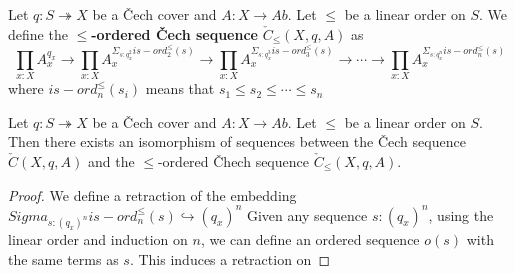 \begin{definition}
  Let $q: S \twoheadrightarrow X$ be a \v Cech cover and $A: X \to Ab$. Let $\leq$ be a linear order on $S$. 
  We define the \textbf{$\leq$-ordered \v Cech sequence} $\check C_{\leq} (X,q,A)$ as 
  $$
  \prod_{x:X} A_x^{q_x}
  \to 
  \prod_{x:X} A_x^{\Sigma_{s: q_x^2 } is-ord^\leq_2(s)}
  \to 
  \prod_{x:X} A_x^{\Sigma_{s: q_x^3 } is-ord^\leq_3(s)}
  \to 
  \cdots 
  \to 
  \prod_{x:X} A_x^{\Sigma_{s: q_x^n } is-ord^\leq_n(s)}
  $$
  where $is-ord^\leq_n(s_i)$ means that $s_1 \leq s_2 \leq \cdots \leq s_n$
\end{definition}
\begin{lemma}
  Let $q: S \twoheadrightarrow X$ be a \v Cech cover and $A: X \to Ab$. Let $\leq$ be a linear order on $S$. 
  Then there exists an isomorphism of sequences between the \v Cech sequence $\check C(X,q,A)$ and the $\leq$-ordered \v Chech sequence $\check C_{\leq}(X , q, A)$. 
\end{lemma}
\begin{proof} 
  We define a retraction of the embedding
  $
  Sigma_{s:(q_x)^n} is-ord_n^\leq(s) \hookrightarrow (q_x)^n
  $ 
  Given any sequence $s:(q_x)^n$, using the linear order and induction on $n$, we can define an ordered sequence $o(s)$ with the same terms as $s$. This induces a retraction on 
\end{proof}
